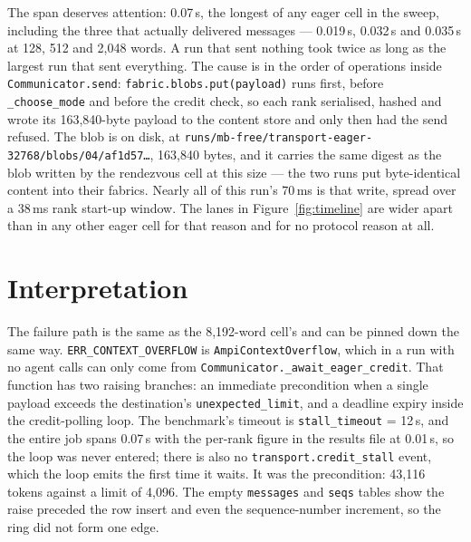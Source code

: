 \documentclass[11pt]{article}
\begin{document}
The span deserves attention: 0.07\,s, the longest of any eager cell in the sweep,
including the three that actually delivered messages --- 0.019\,s, 0.032\,s and
0.035\,s at 128, 512 and 2{,}048 words. A run that sent nothing took twice as long as
the largest run that sent everything. The cause is in the order of operations inside
\texttt{Communicator.send}: \texttt{fabric.blobs.put(payload)} runs first, before
\texttt{\_choose\_mode} and before the credit check, so each rank serialised, hashed
and wrote its 163{,}840-byte payload to the content store and only then had the send
refused. The blob is on disk, at
\texttt{runs/mb-free/transport-eager-32768/blobs/04/af1d57\ldots}, 163{,}840 bytes,
and it carries the same digest as the blob written by the rendezvous cell at this
size --- the two runs put byte-identical content into their fabrics. Nearly all of
this run's 70\,ms is that write, spread over a 38\,ms rank start-up window. The lanes
in Figure~\ref{fig:timeline} are wider apart than in any other eager cell for that
reason and for no protocol reason at all.

\section{Interpretation}

The failure path is the same as the 8{,}192-word cell's and can be pinned down the
same way. \texttt{ERR\_CONTEXT\_OVERFLOW} is \texttt{AmpiContextOverflow}, which in a
run with no agent calls can only come from
\texttt{Communicator.\_await\_eager\_credit}. That function has two raising branches:
an immediate precondition when a single payload exceeds the destination's
\texttt{unexpected\_limit}, and a deadline expiry inside the credit-polling loop. The
benchmark's timeout is \texttt{stall\_timeout} = 12\,s, and the entire job spans
0.07\,s with the per-rank figure in the results file at 0.01\,s, so the loop was never
entered; there is also no \texttt{transport.credit\_stall} event, which the loop emits
the first time it waits. It was the precondition: 43{,}116 tokens against a limit of
4{,}096. The empty \texttt{messages} and \texttt{seqs} tables show the raise preceded
the row insert and even the sequence-number increment, so the ring did not form one
edge.
\end{document}
